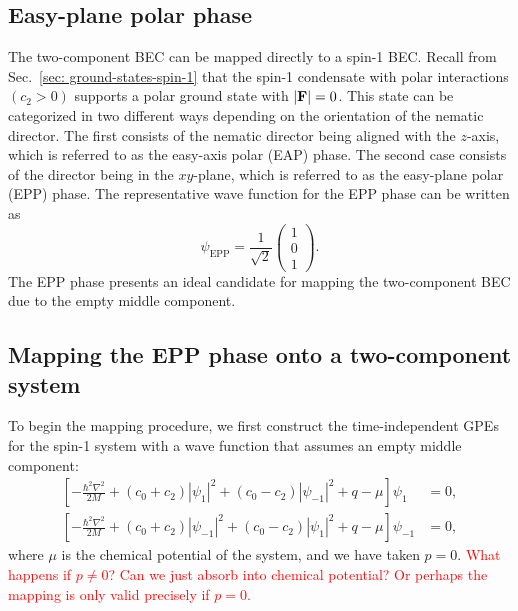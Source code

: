 \subsection{Easy-plane polar phase}\label{subsec:easy-plane-polar-phase}
The two-component BEC can be mapped directly to a spin-1 BEC\@.
Recall from Sec.~\ref{sec: ground-states-spin-1} that the spin-1 condensate
with polar interactions \((c_2 > 0)\) supports a polar ground state with
\(|\vb{F}|=0\).
This state can be categorized in two different ways depending on the orientation
of the nematic director.
The first consists of the nematic director being aligned with the \( z \)-axis,
which is referred to as the easy-axis polar (EAP) phase.
The second case consists of the director being in the \( xy \)-plane, which is
referred to as the easy-plane polar (EPP) phase.
The representative wave function for the EPP phase can be written as
\begin{equation}
    \psi_\mathrm{EPP} = \frac{1}{\sqrt{2}}\begin{pmatrix}
        1 \\ 0 \\ 1
    \end{pmatrix}.
    \label{eq:EPP_wavefunction}
\end{equation}
The EPP phase presents an ideal candidate for mapping the two-component BEC
due to the empty middle component.

\subsection{Mapping the EPP phase onto a two-component system}
To begin the mapping procedure, we first construct the time-independent
GPEs for the spin-1 system with a wave function that assumes an empty middle
component:
\begin{equation}
    \begin{aligned}
        \left[-\frac{\hbar^2\nabla^2}{2M}
        + (c_0 + c_2)|\psi_1|^2 + (c_0 - c_2)|\psi_{-1}|^2 
        + q - \mu\right]\psi_1 &= 0, \\
        \left[-\frac{\hbar^2\nabla^2}{2M}
        + (c_0 + c_2)|\psi_{-1}|^2 + (c_0 - c_2)|\psi_1|^2 
        + q - \mu\right]\psi_{-1} &= 0,
    \end{aligned}
    \label{eq:EPP-time-independent-GPEs}
\end{equation}
where \( \mu \) is the chemical potential of the system, and we have taken
\( p=0 \).
\textcolor{red}{What happens if \(p \neq 0\)? Can we just absorb into chemical
potential? Or perhaps the mapping is only valid precisely if \(p = 0\).}


